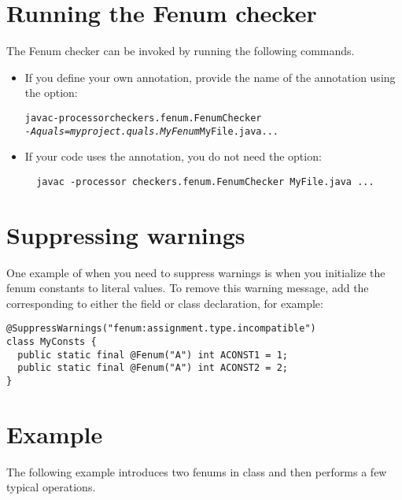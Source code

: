 \section{Running the Fenum checker\label{fenum-running}}

The Fenum checker can be invoked by running the following commands.

\begin{itemize}
  \item 
If you define your own annotation, provide the name of the annotation using the
 option:

\begin{alltt}
  javac -processor checkers.fenum.FenumChecker
        \textit{-Aquals=myproject.quals.MyFenum} MyFile.java ...
\end{alltt}


\item
If your code uses the  annotation, you do
not need the  option:

\begin{Verbatim}
  javac -processor checkers.fenum.FenumChecker MyFile.java ...
\end{Verbatim}

\end{itemize}



\section{Suppressing warnings\label{fenum-suppressing}}

One example of when you need to suppress warnings is when you initialize the
fenum constants to literal values.
To remove this warning message, add the corresponding  to either
the field or class declaration, for example:

\begin{Verbatim}
@SuppressWarnings("fenum:assignment.type.incompatible")
class MyConsts {
  public static final @Fenum("A") int ACONST1 = 1;
  public static final @Fenum("A") int ACONST2 = 2;  
}
\end{Verbatim}



\section{Example\label{fenum-example}}

The following example introduces two fenums in class 
and then performs a few typical operations.

